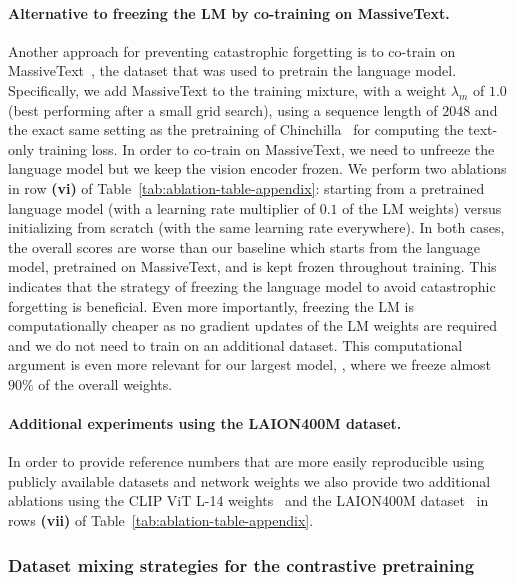 \paragraph{Alternative to freezing the LM by co-training on MassiveText.}
Another approach for preventing catastrophic forgetting is to co-train on MassiveText~\citep{gopher}, the dataset that was used to pretrain the language model.
Specifically, we add MassiveText to the training mixture, with a weight $\lambda_m$ of $1.0$ (best performing after a small grid search), using a sequence length of $2048$ and the exact same setting as the pretraining of Chinchilla~\citep{chinchilla} for computing the text-only training loss.
In order to co-train on MassiveText, we need to unfreeze the language model but we keep the vision encoder frozen. 
We perform two ablations in row \textbf{(vi)} of Table~\ref{tab:ablation-table-appendix}: starting from a pretrained language model (with a learning rate multiplier of $0.1$ of the LM weights) versus initializing from scratch (with the same learning rate everywhere).
In both cases, the overall scores are worse than our baseline which starts from the language model, pretrained on MassiveText, and is kept frozen throughout training.
This indicates that the strategy of freezing the language model to avoid catastrophic forgetting is beneficial.
Even more importantly, freezing the LM is computationally cheaper as no gradient updates of the LM weights are required and we do not need to train on an additional dataset.
This computational argument is even more relevant for our largest model, \largemfull{}, where we freeze almost $90\%$ of the overall weights.

\paragraph{Additional experiments using the LAION400M dataset.}
In order to provide reference numbers that are more easily reproducible using publicly available datasets and network weights we also provide two additional ablations using the CLIP ViT L-14 weights~\cite{clip} and the LAION400M dataset~\cite{schuhmann2021laion} in rows \textbf{(vii)} of Table~\ref{tab:ablation-table-appendix}.

\subsubsection{Dataset mixing strategies for the contrastive pretraining}
\label{app:contrastive_ablation}


